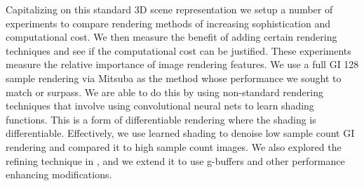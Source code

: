 \documentclass[10pt,twocolumn,letterpaper]{article}
\newcommand{\tompson}[1]{{\color{green} JT: #1}}
\begin{document}




Capitalizing on this standard 3D scene representation we setup a number of experiments to compare rendering methods of increasing sophistication and computational cost.  We then measure the benefit of adding certain rendering techniques and see if the computational cost can be justified.  These experiments measure the relative importance of image rendering features. We use a full GI 128 sample rendering via Mitsuba as the method whose performance we sought to match or surpass. %
We are able to do this by using non-standard rendering techniques that involve using convolutional neural nets to learn shading functions.  This is a form of differentiable rendering where the shading is differentiable. Effectively, we use learned shading to denoise low sample count GI rendering and compared it to high sample count images.  We also explored the refining technique in \cite{DBLP:journals/corr/ShrivastavaPTSW16}, and we extend it to use g-buffers and other performance enhancing modifications.
\end{document}
